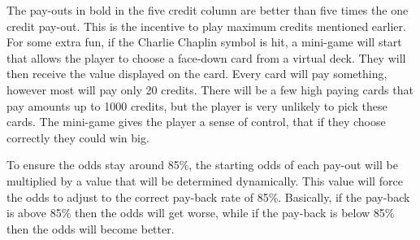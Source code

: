 The pay-outs in bold in the five credit column are better than five times the one credit pay-out.  This is the incentive to play maximum credits mentioned earlier.  For some extra fun, if the Charlie Chaplin symbol is hit, a mini-game will start that allows the player to choose a face-down card from a virtual deck.  They will then receive the value displayed on the card.  Every card will pay something, however most will pay only 20 credits.  There will be a few high paying cards that pay amounts up to 1000 credits, but the player is very unlikely to pick these cards.  The mini-game gives the player a sense of control, that if they choose correctly they could win big.

To ensure the odds stay around 85\%, the starting odds of each pay-out will be multiplied by a value that will be determined dynamically.  This value will force the odds to adjust to the correct pay-back rate of 85\%.  Basically, if the pay-back is above 85\% then the odds will get worse, while if the pay-back is below 85\% then the odds will become better.

